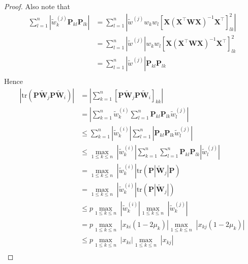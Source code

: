 \documentclass[11pt, a4paper]{article}
\newcommand*{\bb}{\boldsymbol}
\theoremstyle{example} \newtheorem{example}{Example}[section]
\theoremstyle{theorem} \newtheorem{theorem}{Theorem}[section]
\theoremstyle{theorem }\newtheorem{proposition}{Proposition}[section]
\theoremstyle{theorem }\newtheorem{corollary}{Corollary}[section]
\def\\bbeta{\bb{\\bbeta}}
\begin{document}
\begin{proof}
Also note that 
\begin{equation}
\begin{aligned}
\sum_{l=1}^{n}\left| \widetilde{w}_k^{(j)}\bb P_{kl}\bb P_{lk} \right| 
&=  \sum_{l=1}^{n} \left|\widetilde{w}^{(j)}w_kw_l [\bb X(\bb X^\top\bb W\bb X)^{-1}\bb X^\top]_{lk}^2 \right| \\ 
&= \sum_{l=1}^{n} \left|\widetilde{w}^{(j)} \right|w_kw_l [\bb X(\bb X^\top\bb W\bb X)^{-1}\bb X^\top]_{lk}^2  \\ 
&= \sum_{l=1}^{n}|\widetilde{w}^{(j)}| \bb P_{kl}\bb P_{lk} \\ 
\end{aligned}
\end{equation}
Hence 
\begin{equation}
\begin{aligned}
\left|	\textrm{tr}\left(\bb P\widetilde{\bb W}_j \bb P\widetilde{\bb W}_i \right) \right| 
&= \left| \sum_{k=1}^{n}\left[\bb P\widetilde{\bb W}_j\bb P\widetilde{\bb W}_i\right]_{kk} \right| \\ 
&=\left|\sum_{k=1}^{n}\widetilde{w}^{(i)}_k\sum_{l=1}^{n}\bb P_{kl}\bb P_{lk}\widetilde{w}^{(j)}_l \right| \\ 
&\leq 	\sum_{k=1}^{n}\left|\widetilde{w}^{(i)}_k\right|\sum_{l=1}^{n}\left| \bb P_{kl}\bb P_{lk}\widetilde{w}^{(j)}_l \right| \\ 
&\leq \underset{1\leq k \leq n}{\max} \; \left|\widetilde{w}^{(i)}_k\right| \sum_{k=1}^{n}\sum_{l=1}^{n} \bb P_{kl}\bb P_{lk}\left| \widetilde{w}^{(j)}_l \right| \\ 
&=  \underset{1\leq k \leq n}{\max} \; \left|\widetilde{w}^{(i)}_k\right| \textrm{tr}\left(\bb P|\widetilde{\bb W}_{j}|\bb P \right) \\
&=  \underset{1\leq k \leq n}{\max} \; \left|\widetilde{w}^{(i)}_k\right| \textrm{tr}\left(\bb P|\widetilde{\bb W}_{j}|\right) \\
&\leq p\underset{1\leq k \leq n}{\max} \; \left|\widetilde{w}^{(i)}_k\right| \underset{1\leq k \leq n}{\max} \; \left|\widetilde{w}^{(j)}_k\right| \\ 
&= p\underset{1\leq k \leq n}{\max} \; \left|x_{ki}(1-2\mu_k)\right| \underset{1\leq k \leq n}{\max} \; \left|x_{kj}(1-2\mu_k)\right| \\ 
&\leq  p\underset{1\leq k \leq n}{\max} \; \left|x_{ki}\right| \underset{1\leq k \leq n}{\max} \; \left|x_{kj}\right| \\ 
\end{aligned}
\end{equation}


\end{proof}
\end{document}
